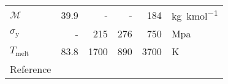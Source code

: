 \begin{refsection}
\begin{table}[h]
\begin{tabular}{@{}lrrrrl@{}}
            $\mathcal{M}$       & 39.9                                           & -                               & -                                                      & 184                                                                            & \unit{kg.kmol^{-1}}     \\
            $\sigma_\mathrm{y}$ & -                                               & 215                            & 276                                                   & 750                                                                            & \unit{Mpa}              \\
            $T_\mathrm{melt}$   & 83.8                                           & 1700                           & 890                                                   & 3700                                                                           & \unit{K}                \\
            Reference           & \cite{lemmonThermophysicalPropertiesFluid2023} & \cite{matweb304StainlessSteel} & \cite{aerospacespecificationmetalsincASMMaterialData} & \cite{royalsocietyofchemistryTungstenElementInformation2023,   matwebTungsten} &                          \\
            \bottomrule
        \end{tabular}
    \end{table}
    \renewcommand{\bibfont}{\small}
    \printbibliography[
        heading=none,
        prenote=bibmark
    ]
\end{refsection}
